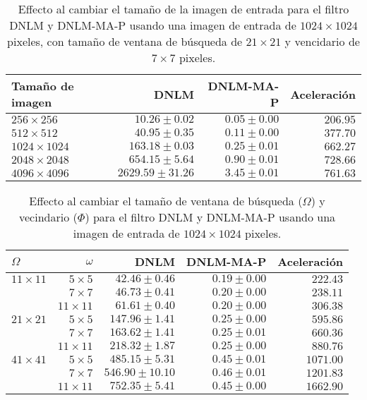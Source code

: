 \begin{table}
\protect\caption[Efecto al cambiar tama\~no de imagen de entrada]{Effecto al cambiar el tama\~no de la imagen de entrada para el filtro DNLM y DNLM-MA-P usando una imagen de entrada de  $1024 \times 1024$ pixeles, con tama\~no de ventana de b\'usqueda de $21 \times 21$ y vencidario de $7 \times 7$ pixeles. \label{tabla:scala1}}
\centering
\begin{tabular}{lrrr}
Tama\~no de imagen & DNLM \left[s\right]& DNLM-MA-P\left[s\right]& Aceleraci\'on \left[x\right] \tabularnewline
\hline
$256 \times 256$ & $10.26\pm0.02$ & $0.05\pm0.00$ & $206.95$ \tabularnewline
$512 \times 512$ & $40.95\pm0.35$ & $0.11\pm0.00$ & $377.70$ \tabularnewline
$1024 \times 1024$ & $163.18\pm0.03$ & $0.25\pm0.01$ & $662.27$ \tabularnewline
$2048 \times 2048$ & $654.15\pm5.64$ & $0.90\pm0.01$ & $728.66$ \tabularnewline
$4096 \times 4096$ & $2629.59\pm31.26$ & $3.45\pm0.01$ & $761.63$ \tabularnewline
\end{tabular}
\end{table}


\begin{table}
\protect\caption[Efecto al cambiar par\'ametros $\Omega$ y $\Phi$]{Effecto al cambiar el tama\~no de ventana de b\'usqueda ($\Omega$) y vecindario ($\Phi$) para el filtro DNLM y DNLM-MA-P usando una imagen de entrada de  $1024 \times 1024$ pixeles. \label{tabla:scala2}}
\centering
\begin{tabular}{lrrrr}
$\Omega$  & $\omega$ & DNLM \left[s\right]& DNLM-MA-P \left[s\right]& Aceleraci\'on \left[x\right]\tabularnewline
\hline
$11 \times 11$ & $5 \times 5$ & $42.46\pm0.46$ & $0.19\pm0.00$ & $222.43$ \tabularnewline
 & $7 \times 7$ & $46.73\pm0.41$ & $0.20\pm0.00$ & $238.11$ \tabularnewline
 & $11 \times 11$ & $61.61\pm0.40$ & $0.20\pm0.00$ & $306.38$ \tabularnewline
$21 \times 21$ & $5 \times 5$ & $147.96\pm1.41$ & $0.25\pm0.00$ & $595.86$ \tabularnewline
 & $7 \times 7$ & $163.62\pm1.41$ & $0.25\pm0.01$ & $660.36$ \tabularnewline
 & $11 \times 11$ & $218.32\pm1.87$ & $0.25\pm0.00$ & $880.76$ \tabularnewline
 $41 \times 41$ & $5 \times 5$ & $485.15\pm5.31$ & $0.45\pm0.01$ & $1071.00$ \tabularnewline
 & $7 \times 7$ & $546.90\pm10.10$ & $0.46\pm0.01$ & $1201.83$ \tabularnewline
 & $11 \times 11$ & $752.35\pm5.41$ & $0.45\pm0.00$ & $1662.90$ \tabularnewline
\end{tabular}
\end{table}





